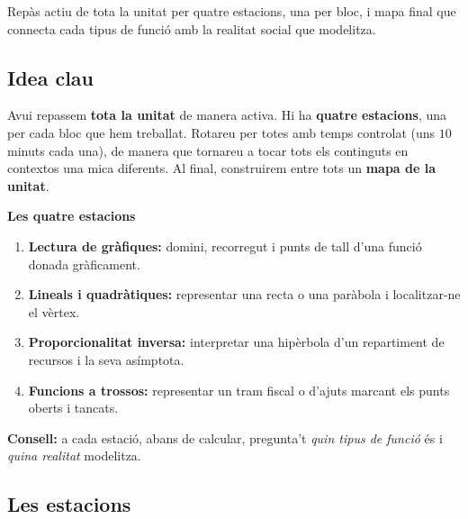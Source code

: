 %
{Repàs actiu de tota la unitat per quatre estacions, una per bloc, i mapa final que connecta cada tipus de funció amb la realitat social que modelitza.}

\subsection{Idea clau}

Avui repassem \textbf{tota la unitat} de manera activa. Hi ha \textbf{quatre
estacions}, una per cada bloc que hem treballat. Rotareu per totes amb temps
controlat (uns $10$ minuts cada una), de manera que tornareu a tocar tots els
continguts en contextos una mica diferents. Al final, construirem entre tots un
\textbf{mapa de la unitat}.

\begin{idea}
\textbf{Les quatre estacions}
\begin{enumerate}[leftmargin=1.6em, itemsep=2pt]
  \item \textbf{Lectura de gràfiques:} domini, recorregut i punts de tall d'una
        funció donada gràficament.
  \item \textbf{Lineals i quadràtiques:} representar una recta o una paràbola i
        localitzar-ne el vèrtex.
  \item \textbf{Proporcionalitat inversa:} interpretar una hipèrbola d'un repartiment
        de recursos i la seva asímptota.
  \item \textbf{Funcions a trossos:} representar un tram fiscal o d'ajuts marcant els
        punts oberts i tancats.
\end{enumerate}
\textbf{Consell:} a cada estació, abans de calcular, pregunta't \emph{quin tipus de
funció} és i \emph{quina realitat} modelitza.
\end{idea}

\subsection{Les estacions}

